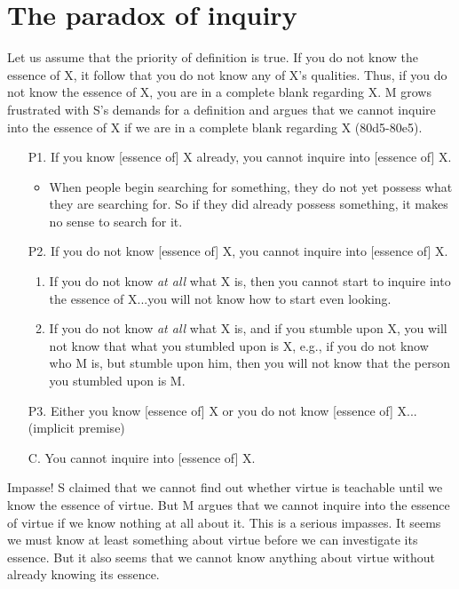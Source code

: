 \documentclass[10 pt]{article}
\begin{document}
\section*{The paradox of inquiry}
Let us assume that the priority of definition is true. If you do not know the essence of  X, it follow that you do not know any of X's qualities. Thus, if you do not know the essence of X, you are in a complete blank regarding X. M grows frustrated with S's demands for a definition and argues that we cannot inquire into the essence of X if we are in a complete blank regarding X (80d5-80e5). 

\begin{enumerate}
\item[P1.] If you know [essence of] X already, you cannot inquire into [essence of] X. 
\begin{itemize}
\item When people begin searching for something, they do not yet possess what they are searching for. So if they did already possess something, it makes no sense to search for it.
\end{itemize}
\item[P2.] If you do not know [essence of] X, you cannot inquire into [essence of] X.\begin{enumerate}
\item If you do not know \emph{at all} what X is, then you cannot start to inquire into the essence of X...you will not know how to start even looking.
\item If you do not know \emph{at all} what X is, and if you stumble upon X, you will not know that what you stumbled upon is X, e.g., if you do not know who M is, but stumble upon him, then you will not know that the person you stumbled upon is M. 
\end{enumerate}
\item[P3.] Either you know [essence of]  X or you do not know [essence of] X...(implicit premise) 
\item[C.] You cannot inquire into [essence of] X.
\end{enumerate}
Impasse!  S claimed that we cannot find out whether virtue is teachable until we know the essence of virtue.  But M argues that we cannot inquire into the essence of virtue if we know nothing at all about it. This is a serious impasses. It seems we must know at least something about virtue before we can investigate its essence. But it also seems that we cannot know anything about virtue without already knowing its essence.  
\end{document}
